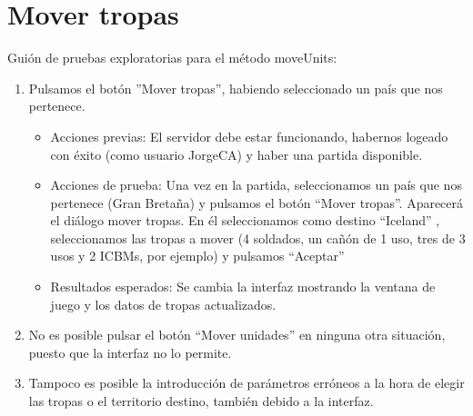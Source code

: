 \section{Mover tropas}

Guión de pruebas exploratorias para el método moveUnits:

\begin{enumerate}
\item Pulsamos el botón ''Mover tropas'', habiendo seleccionado un país que nos pertenece.
	\begin{itemize}
	\item Acciones previas: El servidor debe estar funcionando, habernos logeado con éxito (como usuario JorgeCA) y haber una partida disponible.
	\item Acciones de prueba: Una vez en la  partida, seleccionamos un país que nos pertenece (Gran Bretaña) y pulsamos el botón ``Mover tropas''.
Aparecerá el diálogo mover tropas. En él seleccionamos como destino ``Iceland'' , seleccionamos las tropas a mover (4 soldados, un cañón de 1 uso, tres de 3 usos y 2 ICBMs, 
por ejemplo) y pulsamos ``Aceptar''
	\item Resultados esperados: Se cambia la interfaz mostrando la ventana de juego y los datos de tropas actualizados.
	\end{itemize}
\item No es posible pulsar el botón ``Mover unidades'' en ninguna otra situación, puesto que la interfaz no lo permite.
\item Tampoco es posible la introducción de parámetros erróneos a la hora de elegir las tropas o el territorio destino, también debido a la interfaz.

\end{enumerate}

